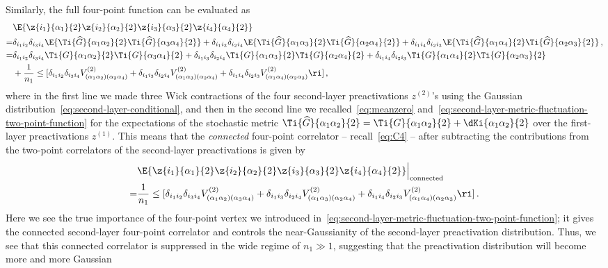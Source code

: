 Similarly, the full four-point function can be evaluated as
\begin{align}\label{eq:M4_MLP2}
&\E{\z{i_1}{\alpha_1}{2}\z{i_2}{\alpha_2}{2}\z{i_3}{\alpha_3}{2}\z{i_4}{\alpha_4}{2}}\, \\
=&\delta_{i_1i_2}\delta_{i_3 i_4} \E{\Ti{\widehat{G}}{\alpha_1 \alpha_2}{2}\Ti{\widehat{G}}{\alpha_3 \alpha_4}{2}}+\delta_{i_1i_3}\delta_{i_2 i_4} \E{\Ti{\widehat{G}}{\alpha_1 \alpha_3}{2}\Ti{\widehat{G}}{\alpha_2 \alpha_4}{2}}+\delta_{i_1i_4}\delta_{i_2 i_3} \E{\Ti{\widehat{G}}{\alpha_1 \alpha_4}{2}\Ti{\widehat{G}}{\alpha_2 \alpha_3}{2}}\,, \nonumber\\
=&\delta_{i_1i_2}\delta_{i_3 i_4} \Ti{G}{\alpha_1 \alpha_2}{2}\Ti{G}{\alpha_3 \alpha_4}{2}+\delta_{i_1i_3}\delta_{i_2 i_4} \Ti{G}{\alpha_1 \alpha_3}{2}\Ti{G}{\alpha_2 \alpha_4}{2}+\delta_{i_1i_4}\delta_{i_2 i_3} \Ti{G}{\alpha_1 \alpha_4}{2}\Ti{G}{\alpha_2 \alpha_3}{2}\, \nonumber\\
&+\frac{1}{n_1}\le[\delta_{i_1i_2}\delta_{i_3 i_4}V^{(2)}_{(\alpha_1\alpha_2)(\alpha_3\alpha_4)}+\delta_{i_1i_3}\delta_{i_2 i_4}V^{(2)}_{(\alpha_1\alpha_3)(\alpha_2\alpha_4)}+\delta_{i_1i_4}\delta_{i_2 i_3}V^{(2)}_{(\alpha_1\alpha_4)(\alpha_2\alpha_3)} \ri]\, ,\nonumber
\end{align}
where in the first line we made three Wick contractions of the four second-layer preactivations $z^{(2)}$'s using the Gaussian distribution~\eqref{eq:second-layer-conditional}, and then in the second line we recalled~\eqref{eq:meanzero} and~\eqref{eq:second-layer-metric-fluctuation-two-point-function} for the expectations of the stochastic metric $ \Ti{\widehat{G}}{\alpha_1 \alpha_2}{2}=\Ti{G}{\alpha_1 \alpha_2}{2}+\dKi{\alpha_1\alpha_2}{2}$ over the first-layer preactivations $z^{(1)}$.
This means that the \emph{connected} four-point correlator -- recall~\eqref{eq:C4} -- after subtracting the contributions from the two-point correlators of the second-layer preactivations is given by
\begin{align}\label{eq:C4_MLP2}
&\E{\z{i_1}{\alpha_1}{2}\z{i_2}{\alpha_2}{2}\z{i_3}{\alpha_3}{2}\z{i_4}{\alpha_4}{2}}\Big\vert_{\text{connected}}\, \\
=&\frac{1}{n_1}\le[\delta_{i_1i_2}\delta_{i_3 i_4}V^{(2)}_{(\alpha_1\alpha_2)(\alpha_3\alpha_4)}+\delta_{i_1i_3}\delta_{i_2 i_4}V^{(2)}_{(\alpha_1\alpha_3)(\alpha_2\alpha_4)}+\delta_{i_1i_4}\delta_{i_2 i_3}V^{(2)}_{(\alpha_1\alpha_4)(\alpha_2\alpha_3)} \ri]\, . \nonumber
\end{align}
Here we see the true importance of the four-point vertex we introduced in~\eqref{eq:second-layer-metric-fluctuation-two-point-function}; it gives the connected second-layer four-point correlator and controls the near-Gaussianity of the second-layer preactivation distribution. Thus, we see that this connected correlator is suppressed in the wide regime of $n_1\gg1$, suggesting that the preactivation distribution will become more and more Gaussian 
